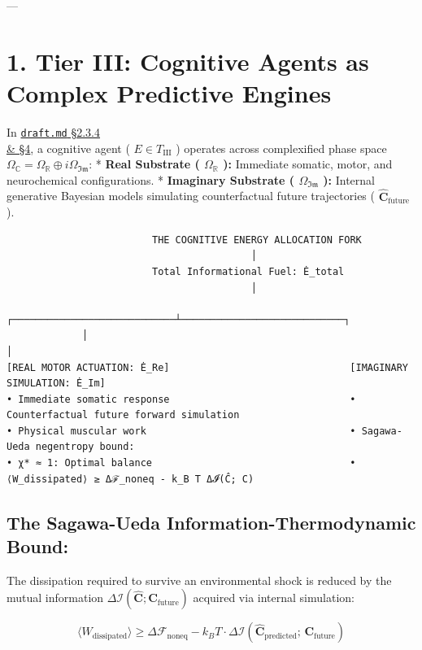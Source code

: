 \documentclass[11pt,a4paper]{article}
\theoremstyle{definition}
\theoremstyle{remark}
\begin{document}
---

\section{1. Tier III: Cognitive Agents as Complex Predictive Engines}

In \href{../existence/draft.md}{\texttt{draft.md} \S 2.3.4 \\& \S 4}, a cognitive agent ( $E \in T_{\text{III}}$ ) operates across complexified phase space $\Omega_{\mathbb{C}} = \Omega_{\mathbb{R}} \oplus i \Omega_{\mathfrak{Im}}$:
* \textbf{Real Substrate ( $\Omega_{\mathbb{R}}$ ):} Immediate somatic, motor, and neurochemical configurations.
* \textbf{Imaginary Substrate ( $\Omega_{\mathfrak{Im}}$ ):} Internal generative Bayesian models simulating counterfactual future trajectories ( $\hat{\mathbf{C}}_{\text{future}}$ ).

\begin{verbatim}
                         THE COGNITIVE ENERGY ALLOCATION FORK
                                          │
                         Total Informational Fuel: Ė_total
                                          │
             ┌────────────────────────────┴────────────────────────────┐
             │                                                         │
[REAL MOTOR ACTUATION: Ė_Re]                               [IMAGINARY SIMULATION: Ė_Im]
• Immediate somatic response                               • Counterfactual future forward simulation
• Physical muscular work                                   • Sagawa-Ueda negentropy bound:
• χ* ≈ 1: Optimal balance                                  • ⟨W_dissipated⟩ ≥ Δℱ_noneq - k_B T Δ𝓘(Ĉ; C)
\end{verbatim}

\subsection{The Sagawa-Ueda Information-Thermodynamic Bound:}
The dissipation required to survive an environmental shock is reduced by the mutual information $\Delta \mathcal{I}(\hat{\mathbf{C}}; \mathbf{C}_{\text{future}})$ acquired via internal simulation:


\begin{equation}
\boxed{\langle W_{\text{dissipated}} \rangle \ge \Delta \mathcal{F}_{\text{noneq}} - k_B T \cdot \Delta \mathcal{I}\left( \hat{\mathbf{C}}_{\text{predicted}}; \, \mathbf{C}_{\text{future}} \right)}
\end{equation}
\end{document}
